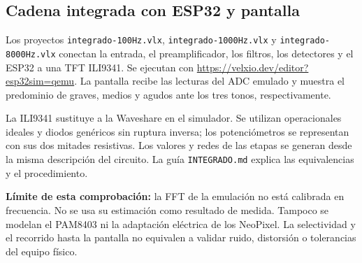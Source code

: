 \subsection{Cadena integrada con ESP32 y pantalla}
Los proyectos \texttt{integrado-100Hz.vlx}, \texttt{integrado-1000Hz.vlx} y \texttt{integrado-8000Hz.vlx} conectan la entrada, el preamplificador, los filtros, los detectores y el ESP32 a una TFT ILI9341. Se ejecutan con \url{https://velxio.dev/editor?esp32sim=qemu}. La pantalla recibe las lecturas del ADC emulado y muestra el predominio de graves, medios y agudos ante los tres tonos, respectivamente.

La ILI9341 sustituye a la Waveshare en el simulador. Se utilizan operacionales ideales y diodos genéricos sin ruptura inversa; los potenciómetros se representan con sus dos mitades resistivas. Los valores y redes de las etapas se generan desde la misma descripción del circuito. La guía \texttt{INTEGRADO.md} explica las equivalencias y el procedimiento.

\textbf{Límite de esta comprobación:} la FFT de la emulación no está calibrada en frecuencia. No se usa su estimación como resultado de medida. Tampoco se modelan el PAM8403 ni la adaptación eléctrica de los NeoPixel. La selectividad y el recorrido hasta la pantalla no equivalen a validar ruido, distorsión o tolerancias del equipo físico.
